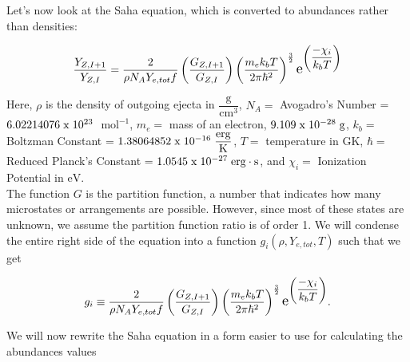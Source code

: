 \documentclass[11pt,a4paper]{article}
\begin{document}
Let's now look at the Saha equation, which is converted to abundances rather than densities: 

\begin{align}
\frac{Y_{Z,I+1}}{Y_{Z,I}}  = \frac{2}{\rho N_A  Y_{e,tot} f}  \left(\frac{G_{Z,I+1}}{G_{Z,I}}\right) \left(\frac{m_e k_b T}{2\pi\hbar^2}\right)^\frac{3}{2} \scalebox{1.3} e^{\left(\dfrac{\displaystyle -\chi_i}{\displaystyle k_b T}\right)}  
\end{align}

Here, $\rho $ is the density of outgoing ejecta in $\mathrm{\dfrac{g}{cm^3}}$, $N_A = $ Avogadro's Number = $6.02214076 \hspace{1mm} \mathrm{x} \hspace{1mm} 10^{23} \hspace{.1 cm} $ $\mathrm{mol^{-1}}$,  $m_e = $ mass of an electron, $9.109 \hspace{1mm} \mathrm{x} \hspace{1mm} 10^{-28} \hspace{.1 cm} \mathrm{g} $, $k_b = $ Boltzman Constant = $1.38064852 \hspace{1mm} \mathrm{x} \hspace{1mm} 10^{-16} \hspace{.1 cm} \mathrm{\dfrac{erg}{K}}$, $T = $ temperature in $\mathrm{GK}$, $\hbar = $ Reduced Planck's Constant = $1.0545 \hspace{1mm} \mathrm{x} \hspace{1mm} 10^{-27} \hspace{.1cm} \mathrm{erg \cdot s}$, and $\chi_i = $ Ionization Potential in $\mathrm{eV}$.\\
 
The function $G$ is the partition function, a number that indicates how many microstates or arrangements are possible. However, since most of these states are unknown, we assume the partition function ratio is of order 1. We will condense the entire right side of the equation into a function $g_i (\rho,Y_{e,tot},T) $ such that we get 

\begin{align} 
g_i \equiv \dfrac{2}{\rho N_A  Y_{e,tot} f}  \left(\dfrac{G_{Z,I+1}}{G_{Z,I}}\right) \left(\dfrac{m_e k_b T}{2\pi\hbar^2}\right)^\frac{3}{2} \scalebox{1.3} e^{\left(\dfrac{\displaystyle -\chi_i}{\displaystyle k_b T}\right)}.
\end{align}

We will now rewrite the Saha equation in a form easier to use for calculating the abundances values
\end{document}
